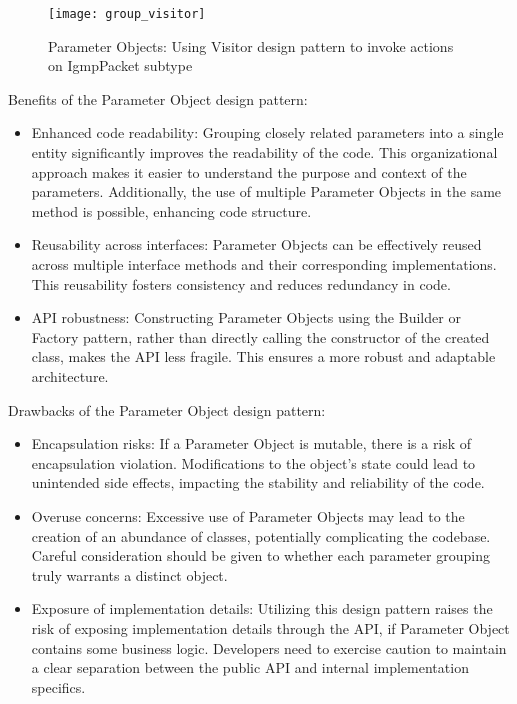 \begin{figure}[!htb]
    \centering
    \texttt{[image: group\_visitor]}
    \caption{Parameter Objects: Using Visitor design pattern to invoke actions on IgmpPacket subtype}
    \label{fig:group_visitor}
\end{figure}

Benefits of the Parameter Object design pattern:

\begin{itemize}
    \item Enhanced code readability:
    Grouping closely related parameters into a single entity significantly improves the readability of the code.
    This organizational approach makes it easier to understand the purpose and context of the parameters.
    Additionally, the use of multiple Parameter Objects in the same method is possible, enhancing code structure.
    \item Reusability across interfaces:
    Parameter Objects can be effectively reused across multiple interface methods and their
    corresponding implementations.
    This reusability fosters consistency and reduces redundancy in code.
    \item API robustness:
    Constructing Parameter Objects using the Builder or Factory pattern, rather than directly calling the constructor
    of the created class, makes the API less fragile.
    This ensures a more robust and adaptable architecture.
\end{itemize}

Drawbacks of the Parameter Object design pattern:

\begin{itemize}
    \item Encapsulation risks:
    If a Parameter Object is mutable, there is a risk of encapsulation violation.
    Modifications to the object's state could lead to unintended side effects,
    impacting the stability and reliability of the code.
    \item Overuse concerns:
    Excessive use of Parameter Objects may lead to the creation of an abundance of classes, potentially complicating
    the codebase.
    Careful consideration should be given to whether each parameter grouping truly warrants a distinct object.
    \item Exposure of implementation details:
    Utilizing this design pattern raises the risk of exposing implementation details through the API\@,
    if Parameter Object contains some business logic.
    Developers need to exercise caution to maintain a clear separation between the public API and internal
    implementation specifics.
\end{itemize}


